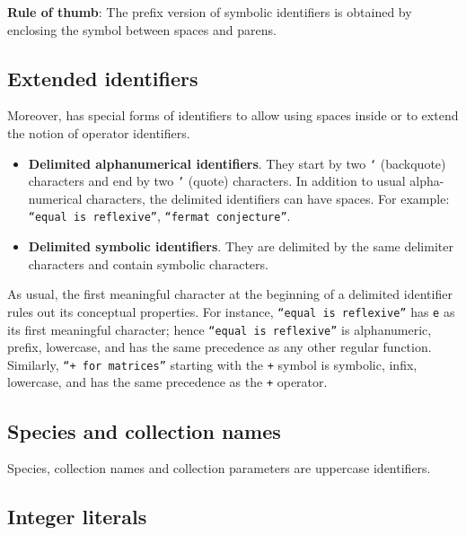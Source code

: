 {{\bf Rule of thumb}: The prefix version of symbolic identifiers is obtained
by enclosing the symbol between spaces and parens.

\subsection{Extended identifiers}
\label{extended-identifiers}

Moreover, {\focal} has special forms of identifiers to allow using
spaces inside or to extend the notion of operator identifiers.
\begin{itemize}
  \item {\bf Delimited alphanumerical identifiers}.
    They start by two {\tt `} (backquote) characters and end by two
    {\tt '} (quote) characters. In addition to usual alpha-numerical
    characters, the delimited identifiers can have spaces. For example:
    {\tt ``equal is reflexive''}, {\tt ``fermat conjecture''}.
  \item {\bf Delimited symbolic identifiers}.
    They are delimited by the same delimiter characters and contain
    symbolic characters.
\end{itemize}

As usual, the first meaningful character at the beginning of a delimited
identifier rules out its conceptual properties. For instance,
{\tt ``equal is reflexive''} has {\tt e} as its first meaningful character; hence
{\tt ``equal is reflexive''} is alphanumeric, prefix, lowercase, and has the
same precedence as any other regular function.
Similarly, {\tt ``+ for matrices''} starting with the {\tt +} symbol is
symbolic, infix, lowercase, and has the same precedence as the {\tt +} operator.

\subsection{Species and collection names}
 Species, collection
names and collection parameters are uppercase identifiers.

\subsection{Integer literals}
\label{integer literals}
\label{octal}
\label{hexadecimal}
\label{binary}

}
